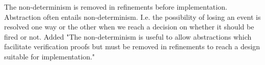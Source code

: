 \documentclass{response}
\begin{document}
\begin{response}
\end{response}

\begin{comment}{Reviewer \#2}
  The current semantics is one of non-determinism as to which events
  will fire in a given microstep.  While this allows refinement, it
  does not admit a deterministic execution strategy, which means that
  it is not currently useful for generation of implementations.  In
  addition, it appears that it is possible that events can be "lost"
  and the system may choose not to execute them.  The authors must
  provide additional justification that this is a sensible semantics;
  I suspect that it will be surprising to most users who are familiar
  with StateCharts.  
 \end{comment}
  
  \begin{response}
	The non-determinism is removed in refinements before implementation. Abstraction often entails non-determinism.
	I.e. the possibility of losing an event is resolved one way or the other when we reach a decision on whether it should be fired or not.
	Added "The non-determinism is useful to allow abstractions which facilitate verification proofs but must be removed in refinements to reach a design suitable for implementation."
  \end{response}

\begin{comment}{Reviewer \#2}  
  When adding transitions at lower layers, it was
  not clear to me how these new transitions fit into the cross-product
  translation used to determine which set of transitions would fire.
  Perhaps this is handled layer-by-layer, but then each layer would
  need a scheduler and this was not discussed.   
\end{comment}

\begin{response}
\end{response}

\begin{comment}{Reviewer \#2}
  The goal appears to be to try to create something that resembles
  StateCharts but is bound to the semantics of Event-B.  In this case,
  the authors should also justify why Event-B is a suitable language
  for representing Statecharts behavior.  In this case, it appeared
  that the target language made some aspects of behavior difficult to
  formalize.  
\end{comment}
\end{document}
